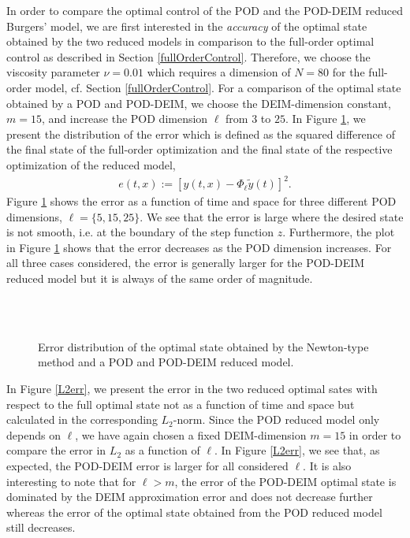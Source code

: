 In order to compare the optimal control of the POD and the POD-DEIM reduced Burgers' model, we are first interested in the \textit{accuracy} of the optimal state obtained by the two reduced models in comparison to the full-order optimal control as described in Section \ref{fullOrderControl}. Therefore, we choose the viscosity parameter $\nu = 0.01$ which requires a dimension of $N = 80$ for the full-order model, cf. Section \ref{fullOrderControl}. For a comparison of the optimal state obtained by a POD and POD-DEIM, we choose the DEIM-dimension constant, $m = 15$, and increase the POD dimension $\ell$ from $3$ to $25$. In Figure \ref{YerrL2}, we present the distribution of the error which is defined as the squared difference of the final state of the full-order optimization and the final state of the respective optimization of the reduced model,
\begin{align*}
 e(t,x) := [y(t,x) - \Phi_\ell \tilde{y}(t)]^2.
\end{align*}
Figure \ref{YerrL2} shows the error as a function of time and space for three different POD dimensions, $\ell = \{5,15,25\}$. We see that the error is large where the desired state is not smooth, i.e. at the boundary of the step function $z$. Furthermore, the plot in Figure \ref{YerrL2} shows that the error decreases as the POD dimension increases. For all three cases considered, the error is generally larger for the POD-DEIM reduced model but it is always of the same order of magnitude.
\begin{figure}[H]
\centering
{}\hfill
{}\hfill
{}\hfill \\
\hfill
{}\hfill
{}\hfill \\
\caption{Error distribution of the optimal state obtained by the Newton-type method and a POD and POD-DEIM reduced model.}\label{YerrL2}
\end{figure}
\newpage
In Figure \ref{L2err}, we present the error in the two reduced optimal sates with respect to the full optimal state not as a function of time and space but calculated in the corresponding $L_2$-norm. Since the POD reduced model only depends on $\ell$, we have again chosen a fixed DEIM-dimension $m = 15$ in order to compare the error in $L_2$ as a function of $\ell$. In Figure \ref{L2err}, we see that, as expected, the POD-DEIM error is larger for all considered $\ell$. It is also interesting to note that for $\ell > m$, the error of the POD-DEIM optimal state is dominated by the DEIM approximation error and does not decrease further whereas the error of the optimal state obtained from the POD reduced model still decreases.
